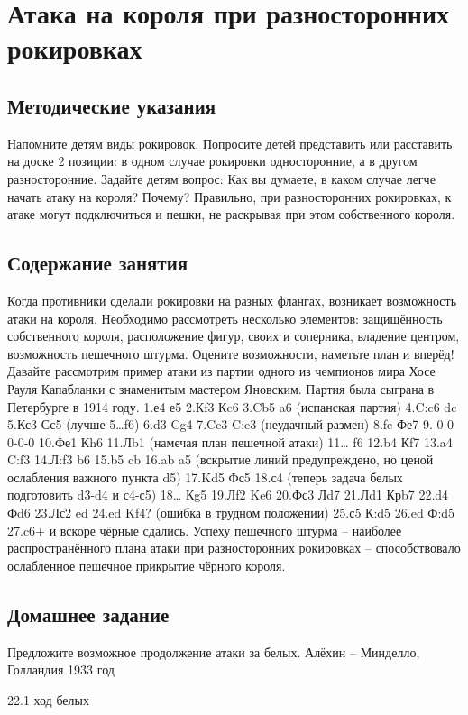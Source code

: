 \chapter{Атака на короля при разносторонних рокировках}

\section{Методические указания}

Напомните детям виды рокировок. Попросите детей представить или расставить на доске 2 позиции: в одном случае рокировки односторонние, а в другом разносторонние. Задайте детям вопрос: Как вы думаете, в каком случае легче начать атаку на короля? Почему? Правильно, при разносторонних рокировках, к атаке могут подключиться и пешки, не раскрывая при этом собственного короля.

\section{Содержание занятия}

Когда противники сделали рокировки на разных флангах, возникает возможность атаки на короля. Необходимо рассмотреть несколько элементов: защищённость собственного короля, расположение фигур, своих и соперника, владение центром, возможность пешечного штурма. Оцените возможности, наметьте план и вперёд!
Давайте рассмотрим пример атаки из партии одного из чемпионов мира Хосе Рауля Капабланки с знаменитым мастером Яновским. Партия была сыграна в Петербурге в 1914 году.
1.е4 е5 2.Кf3 Кc6 3.Cb5 a6 (испанская партия) 4.C:c6 dc 5.Кс3 Сс5 (лучше 5…f6) 6.d3 Cg4 7.Ce3 C:e3 (неудачный размен) 8.fe Фе7 9. 0-0 0-0-0 10.Фе1 Кh6 11.Лb1 (намечая план пешечной атаки) 11… f6 12.b4 Кf7 13.a4 C:f3 14.Л:f3 b6 15.b5 cb 16.ab a5 (вскрытие линий предупреждено, но ценой ослабления важного пункта d5) 17.Kd5 Фс5 18.с4 (теперь задача белых подготовить d3-d4 и с4-с5) 18… Кg5 19.Лf2 Ke6 20.Фс3 Лd7 21.Лd1 Крb7 22.d4 Фd6 23.Лс2 ed 24.ed Kf4? (ошибка в трудном положении) 25.с5 К:d5 26.ed Ф:d5 27.c6+ и вскоре чёрные сдались. Успеху пешечного штурма – наиболее распространённого плана атаки при разносторонних рокировках – способствовало ослабленное пешечное прикрытие чёрного короля.

\section{Домашнее задание}

Предложите возможное продолжение атаки за белых.
Алёхин – Минделло,
Голландия 1933 год
 
22.1 ход белых
